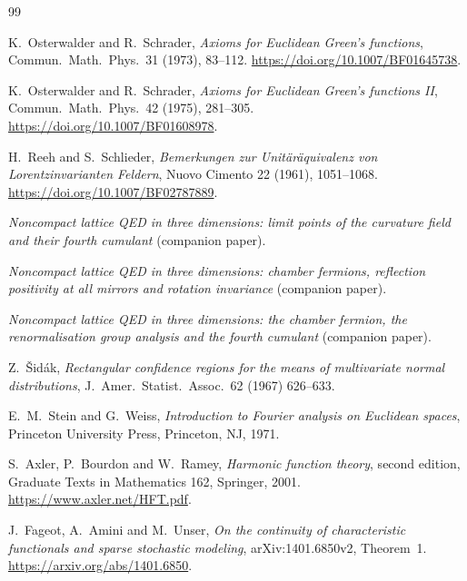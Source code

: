 \documentclass[11pt,letterpaper,reqno]{amsart}
\theoremstyle{definition}
\begin{document}
\begin{thebibliography}{99}

K.~Osterwalder and R.~Schrader,
\emph{Axioms for Euclidean Green's functions},
Commun.\ Math.\ Phys.\ 31 (1973), 83--112.
\url{https://doi.org/10.1007/BF01645738}.

K.~Osterwalder and R.~Schrader,
\emph{Axioms for Euclidean Green's functions II},
Commun.\ Math.\ Phys.\ 42 (1975), 281--305.
\url{https://doi.org/10.1007/BF01608978}.

H.~Reeh and S.~Schlieder,
\emph{Bemerkungen zur Unit\"ar\"aquivalenz von Lorentzinvarianten Feldern},
Nuovo Cimento 22 (1961), 1051--1068.
\url{https://doi.org/10.1007/BF02787889}.

\emph{Noncompact lattice QED in three dimensions: limit points of the curvature field
and their fourth cumulant} (companion paper).

\emph{Noncompact lattice QED in three dimensions: chamber fermions,
reflection positivity at all mirrors and rotation invariance} (companion paper).

\emph{Noncompact lattice QED in three dimensions: the chamber fermion,
the renormalisation group analysis and the fourth cumulant} (companion paper).

Z.~\v{S}id\'ak, \emph{Rectangular confidence regions for the means of multivariate normal distributions}, J.\ Amer.\ Statist.\ Assoc.\ 62 (1967) 626--633.

E.~M.~Stein and G.~Weiss, \emph{Introduction to Fourier analysis on Euclidean spaces},
Princeton University Press, Princeton, NJ, 1971.

S.~Axler, P.~Bourdon and W.~Ramey, \emph{Harmonic function theory},
second edition, Graduate Texts in Mathematics 162, Springer, 2001.
\url{https://www.axler.net/HFT.pdf}.


J.~Fageot, A.~Amini and M.~Unser,
\emph{On the continuity of characteristic functionals and sparse stochastic modeling},
arXiv:1401.6850v2, Theorem~1.
\url{https://arxiv.org/abs/1401.6850}.

\end{thebibliography}
\end{document}
